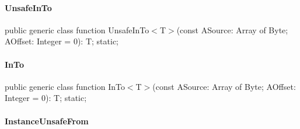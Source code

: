 \documentclass{report}
\newif\ifpdf
\begin{document}
\paragraph*{UnsafeInTo}\hspace*{\fill}

\label{ok_generic.TBitConverter-UnsafeInTo}
\begin{list}{}{
\setlength{\itemindent}{0cm}
\setlength{\listparindent}{0cm}
\setlength{\leftmargin}{\evensidemargin}
\addtolength{\leftmargin}{\tmplength}
\settowidth{\labelsep}{X}
\addtolength{\leftmargin}{\labelsep}
\setlength{\labelwidth}{\tmplength}
}
\item[\textbf{Declaration}\hfill]
\ifpdf
\begin{flushleft}
\fi
\begin{ttfamily}
public generic class function UnsafeInTo{$<$}T{$>$}(const ASource: Array of Byte; AOffset: Integer = 0): T; static;\end{ttfamily}

\ifpdf
\end{flushleft}
\fi

\end{list}
\paragraph*{InTo}\hspace*{\fill}

\label{ok_generic.TBitConverter-InTo}
\begin{list}{}{
\setlength{\itemindent}{0cm}
\setlength{\listparindent}{0cm}
\setlength{\leftmargin}{\evensidemargin}
\addtolength{\leftmargin}{\tmplength}
\settowidth{\labelsep}{X}
\addtolength{\leftmargin}{\labelsep}
\setlength{\labelwidth}{\tmplength}
}
\item[\textbf{Declaration}\hfill]
\ifpdf
\begin{flushleft}
\fi
\begin{ttfamily}
public generic class function InTo{$<$}T{$>$}(const ASource: Array of Byte; AOffset: Integer = 0): T; static;\end{ttfamily}

\ifpdf
\end{flushleft}
\fi

\end{list}
\paragraph*{InstanceUnsafeFrom}\hspace*{\fill}
\end{document}
